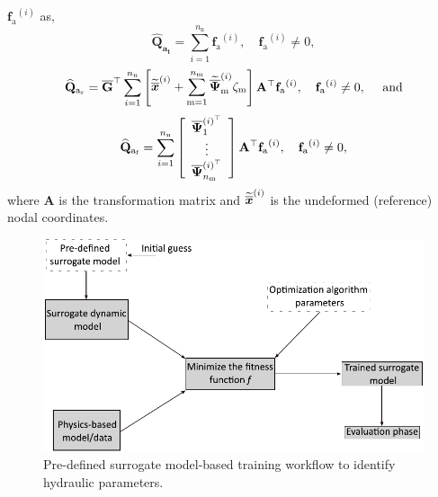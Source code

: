 ${{\mathbf{f}}_{\mathrm{a}}}^{(i)}$  as, 
\begin{equation}\label{Eq03: AppliedForce1}
 {{\mathbf{\widehat{Q}_{\text{a}_{\text{t}}}}}} = \displaystyle\sum_{i=1}^{{n_{\text{n}}}} {{\mathbf{f}}_{\mathrm{a}}}^{(i)}, \quad {{\mathbf{f}}_{\mathrm{a}}}^{(i)} \neq 0, 
\end{equation}
\begin{equation}\label{Eq03: AppliedForce2}
{{\mathbf{\widehat{Q}_{\text{a}_{\text{r}}}}}} = {\overline {\mathbf{G}}}^{\top} \displaystyle\sum_{i=1}^{{n_{\text{n}}}}
\begin{bmatrix}
{\widetilde{\overline{\bm{x}}}}^{(i)} + \displaystyle\sum_{\text{m}=1}^{{n_{\text{m}}}}{\widetilde{\overline{{\bm{\Psi}}}}_{\text{m}}}^{(i)} \mathbf{\zeta}_\text{m} \end{bmatrix}
\mathbf{A}^{\top} {{\mathbf{f}}_{\mathrm{a}}}^{(i)}, \quad {{\mathbf{f}}_{\mathrm{a}}}^{(i)} \neq 0, \quad~\text{and}
\end{equation}
\begin{equation}\label{Eq03: AppliedForce3}
{{\mathbf{\widehat{Q}_{\text{a}_{\text{f}}}}}} = \displaystyle\sum_{i=1}^{{n_{\text{n}}}} 
\left[ 
\begin{array}{c}
\overline{{\bm{\Psi}}}_1^{(i)^{\top}} \\
\vdots \\
\overline{{\bm{\Psi}}}_{{n_{\text{m}}}}^{(i)^{\top}}
\end{array}
\right] 
\mathbf{A}^{\top} {{\mathbf{f}}_{\mathrm{a}}}^{(i)}, \quad {{\mathbf{f}}_{\mathrm{a}}}^{(i)} \neq 0, 
\end{equation}
where $\mathbf{A}$ is the transformation matrix and ${{\widetilde{\overline{\bm{x}}}}^{(i)}}$ is the undeformed (reference) nodal
coordinates.



\begin{figure}[ht]
    \centering
    \includegraphics[width=0.9\linewidth]{Fig02.pdf}
    \caption{Pre-defined surrogate model-based training workflow to identify hydraulic parameters. }
    \label{fig:optimization}
\end{figure}
